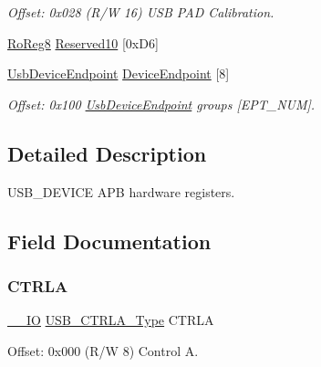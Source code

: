 \begin{DoxyCompactItemize}
\begin{DoxyCompactList}\small\item\em Offset\+: 0x028 (R/W 16) U\+SB P\+AD Calibration. \end{DoxyCompactList}\item 
\mbox{\hyperlink{group___s_a_m_d21_e15_a__definitions_ga0d957f1433aaf5d70e4dc2b68288442d}{Ro\+Reg8}} \mbox{\hyperlink{struct_usb_device_ac615b366d825327aa7079ef09c4b51ad}{Reserved10}} \mbox{[}0x\+D6\mbox{]}
\item 
\mbox{\hyperlink{struct_usb_device_endpoint}{Usb\+Device\+Endpoint}} \mbox{\hyperlink{struct_usb_device_a755b1ba1712add80d2a9193087b93baa}{Device\+Endpoint}} \mbox{[}8\mbox{]}
\begin{DoxyCompactList}\small\item\em Offset\+: 0x100 \mbox{\hyperlink{struct_usb_device_endpoint}{Usb\+Device\+Endpoint}} groups \mbox{[}E\+P\+T\+\_\+\+N\+UM\mbox{]}. \end{DoxyCompactList}\end{DoxyCompactItemize}


\subsection{Detailed Description}
U\+S\+B\+\_\+\+D\+E\+V\+I\+CE A\+PB hardware registers. 

\subsection{Field Documentation}
\mbox{\label{struct_usb_device_aa15f86099ea2915cc8667b8ba3980a91}} 
\subsubsection{\texorpdfstring{CTRLA}{CTRLA}}
{\footnotesize\ttfamily \mbox{\hyperlink{core__cm0plus_8h_aec43007d9998a0a0e01faede4133d6be}{\+\_\+\+\_\+\+IO}} \mbox{\hyperlink{union_u_s_b___c_t_r_l_a___type}{U\+S\+B\+\_\+\+C\+T\+R\+L\+A\+\_\+\+Type}} C\+T\+R\+LA}



Offset\+: 0x000 (R/W 8) Control A. 

\mbox{\label{struct_usb_device_a7d9e693fc058a456305b0e11e25af69b}} 
